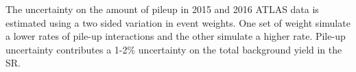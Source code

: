 \indent The uncertainty on the amount of pileup in 2015 and 2016 ATLAS data is estimated using a two sided variation in event weights.  One set of weight simulate a lower rates of pile-up interactions and the other simulate a higher rate.  Pile-up uncertainty contributes a 1-2\% uncertainty on the total background yield in the SR.








  

  
